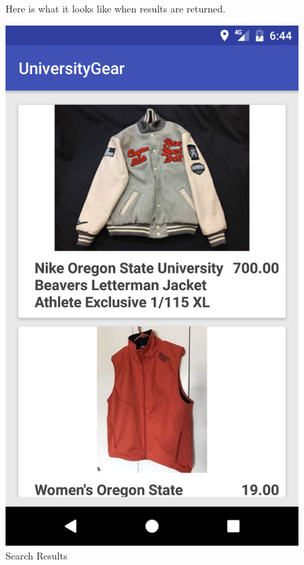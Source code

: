 \documentclass[journal,compsoc, 10pt, draftclsnofoot, onecolumn]{IEEEtran}
\begin{document}
\begin{figure}[!h]
Here is what it looks like when results are returned. 
\centering
\caption{Search Results}
\includegraphics[scale=.15]{results}
\end{figure}
\FloatBarrier
\end{document}
